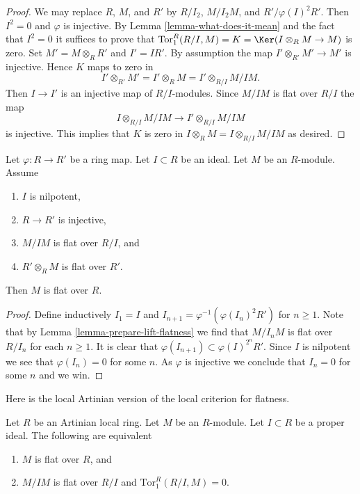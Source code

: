 \begin{proof}
We may replace $R$, $M$, and $R'$ by $R/I_2$, $M/I_2M$, and
$R'/\varphi(I)^2R'$. Then $I^2 = 0$ and $\varphi$ is injective. By
Lemma \ref{lemma-what-does-it-mean}
and the fact that $I^2 = 0$ it suffices to prove that
$\text{Tor}^R_1(R/I, M) = K = \Ker(I \otimes_R M \to M)$ is zero.
Set $M' = M \otimes_R R'$ and $I' = IR'$.
By assumption the map $I' \otimes_{R'} M' \to M'$ is injective.
Hence $K$ maps to zero in
$$
I' \otimes_{R'} M' = I' \otimes_R M = I' \otimes_{R/I} M/IM.
$$
Then $I \to I'$ is an injective map of $R/I$-modules.
Since $M/IM$ is flat over $R/I$ the map
$$
I \otimes_{R/I} M/IM \longrightarrow I' \otimes_{R/I} M/IM
$$
is injective. This implies that $K$ is zero in
$I \otimes_R M = I \otimes_{R/I} M/IM$ as desired.
\end{proof}

\begin{lemma}
\label{lemma-lift-flatness}
Let $\varphi : R \to R'$ be a ring map.
Let $I \subset R$ be an ideal.
Let $M$ be an $R$-module.
Assume
\begin{enumerate}
\item $I$ is nilpotent,
\item $R \to R'$ is injective,
\item $M/IM$ is flat over $R/I$, and
\item $R' \otimes_R M$ is flat over $R'$.
\end{enumerate}
Then $M$ is flat over $R$.
\end{lemma}

\begin{proof}
Define inductively $I_1 = I$ and $I_{n + 1} = \varphi^{-1}(\varphi(I_n)^2R')$
for $n \geq 1$. Note that by
Lemma \ref{lemma-prepare-lift-flatness}
we find that $M/I_nM$ is flat over $R/I_n$ for each $n \geq 1$.
It is clear that $\varphi(I_{n + 1}) \subset \varphi(I)^{2^n}R'$. Since
$I$ is nilpotent we see that $\varphi(I_n) = 0$ for some $n$. As
$\varphi$ is injective we conclude that $I_n = 0$ for some $n$ and
we win.
\end{proof}

\noindent
Here is the local Artinian version of the local criterion for flatness.

\begin{lemma}
\label{lemma-artinian-variant-local-criterion-flatness}
Let $R$ be an Artinian local ring. Let $M$ be an $R$-module.
Let $I \subset R$ be a proper ideal. The following are
equivalent
\begin{enumerate}
\item $M$ is flat over $R$, and
\item $M/IM$ is flat over $R/I$ and $\text{Tor}_1^R(R/I, M) = 0$.
\end{enumerate}
\end{lemma}

